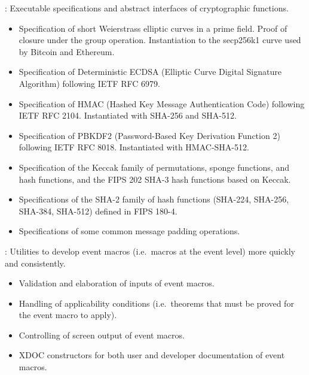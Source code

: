 \begin{frame}

\newlibtitle

:
Executable specifications and abstract interfaces of cryptographic functions.
\begin{itemize}
\item
Specification of short Weierstrass elliptic curves in a prime field.
Proof of closure under the group operation.
Instantiation to the secp256k1 curve used by Bitcoin and Ethereum.
\item
Specification of Deterministic ECDSA
(Elliptic Curve Digital Signature Algorithm)
following IETF RFC 6979.
\item
Specification of HMAC (Hashed Key Message Authentication Code)
following IETF RFC 2104.
Instantiated with SHA-256 and SHA-512.
\item
Specification of PBKDF2 (Password-Based Key Derivation Function 2)
following IETF RFC 8018.
Instantiated with HMAC-SHA-512.
\item
Specification of the Keccak family of permutations, sponge functions,
and hash functions, and the FIPS 202 SHA-3 hash functions based on Keccak.
\item
Specifications of the SHA-2 family of hash functions (SHA-224, SHA-256,
 SHA-384, SHA-512) defined in FIPS 180-4.
\item
Specifications of some common message padding operations.
\end{itemize}

\end{frame}


\begin{frame}

\newlibtitle

:
Utilities to develop event macros (i.e.\ macros at the event level)
more quickly and consistently.
\begin{itemize}
\item
Validation and elaboration of inputs of event macros.
\item
Handling of applicability conditions
(i.e.\ theorems that must be proved for the event macro to apply).
\item
Controlling of screen output of event macros.
\item
XDOC constructors for both user and developer documentation of event macros.
\end{itemize}

\end{frame}

